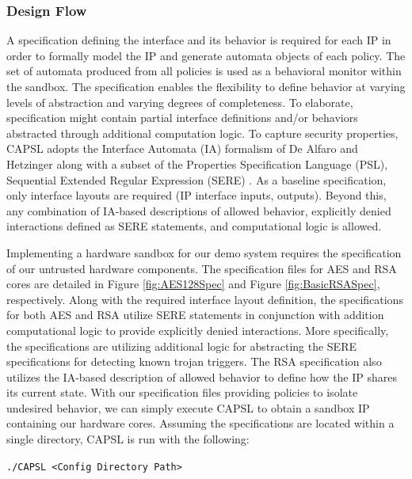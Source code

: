 \documentclass[sigconf]{acmart}
\theoremstyle{plain}
\theoremstyle{remark}
\begin{document}
\subsubsection{Design Flow}
A specification defining the interface and its behavior is required for each IP in order to formally model the IP and generate automata objects of each policy. The set of automata produced from all policies is used as a behavioral monitor within the sandbox. The specification enables the flexibility to define behavior at varying levels of abstraction and varying degrees of completeness. To elaborate, specification might contain partial interface definitions and/or behaviors abstracted through additional computation logic. To capture security properties, CAPSL adopts the Interface Automata (IA) formalism of De Alfaro and Hetzinger \cite{deAlfaro} along with a subset of the Properties Specification Language (PSL), Sequential Extended Regular Expression (SERE) \cite{psl}. As a baseline specification, only interface layouts are required (IP interface inputs, outputs). Beyond this, any combination of IA-based descriptions of allowed behavior, explicitly denied interactions defined as SERE statements, and computational logic is allowed.

Implementing a hardware sandbox for our demo system requires the specification of our untrusted hardware components. The specification files for AES and RSA cores are detailed in Figure \ref{fig:AES128Spec} and Figure \ref{fig:BasicRSASpec}, respectively. Along with the required interface layout definition, the specifications for both AES and RSA utilize SERE statements in conjunction with addition computational logic to provide explicitly denied interactions. More specifically, the specifications are utilizing additional logic for abstracting the SERE specifications for detecting known trojan triggers. The RSA specification also utilizes the IA-based description of allowed behavior to define how the IP shares its current state. With our specification files providing policies to isolate undesired behavior, we can simply execute CAPSL to obtain a sandbox IP containing our hardware cores. Assuming the specifications are located within a single directory, CAPSL is run with the following:

\texttt{./CAPSL <Config Directory Path>}
\end{document}
